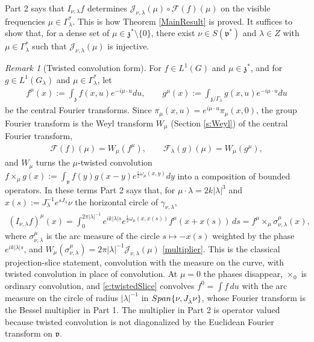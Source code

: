 \documentclass[11pt]{amsart}
\theoremstyle{plain}
\theoremstyle{definition}
\theoremstyle{remark}
\newtheorem{remark}[theorem]{Remark}
\numberwithin{equation}{section}
\def\fz{\mathfrak{z}}
\def\fv{\mathfrak{v}}
\def\cJ{\mathcal{J}}
\def\cF{\mathcal{F}}
\def\mz{\setminus\{0\}}
\numberwithin{equation}{section}
\begin{document}
Part 2 says that $I_{\nu, \lambda}f$ determines $\cJ_{\nu, \lambda}(\mu)\circ\cF(f)(\mu)$ on the visible frequencies $\mu\in \Gamma_\lambda^*$. This is how Theorem \ref{MainResult} is proved. It suffices to show that, for a dense set of $\mu\in \fz^*\mz$, there exist $\nu\in S(\fv^*)$ and $\lambda\in Z$ with $\mu\in \Gamma_\lambda^*$ such that $\cJ_{\nu, \lambda}(\mu)$ is injective. 

\begin{remark}[Twisted convolution form]\label{r:twistedSlice}
	For $f\in L^1(G)$ and $\mu\in \fz^*$, and for $g\in L^1(G_\lambda)$ and $\mu\in \Gamma_\lambda^*$, let
	\begin{align}\label{e:centralFT}
		f^\mu(x):=\int_\fz f(x, u)e^{-i\mu\cdot u}du, \qquad g^\mu(x):=\int_{\fz/\Gamma_\lambda}g(x, u)e^{-i\mu\cdot u}du
	\end{align}
	be the central Fourier transforms. Since $\pi_\mu(x, u)=e^{i\mu\cdot u}\pi_\mu(x, 0)$, the group Fourier transform is the Weyl transform $W_\mu$ (Section \ref{s:Weyl}) of the central Fourier transform,
	\begin{align}\label{e:Weyl}
		\cF(f)(\mu)=W_\mu(f^\mu), \qquad \cF_\lambda(g)(\mu)=W_\mu(g^\mu),
	\end{align}
	and $W_\mu$ turns the $\mu$-twisted convolution $f\times_\mu g(x):=\int_\fv f(y)g(x-y)e^{\frac{i}{2}\omega_\mu(x, y)}dy$ into a composition of bounded operators. In these terms Part 2 says that, for $\mu\cdot\lambda=2k|\lambda|^3$ and $x(s):=J_\lambda^{-1}e^{sJ_\lambda}\nu$ the horizontal circle of $\gamma_{\nu, \lambda}$,
	\begin{align}\label{e:twistedSlice}
		(I_{\nu, \lambda}f)^\mu(x)=\int_0^{2\pi|\lambda|^{-1}}e^{ik|\lambda|s}e^{\frac{i}{2}\omega_\mu(x, x(s))}f^\mu(x+x(s))\, ds=f^\mu\times_\mu\sigma^\mu_{\nu, \lambda}(x),
	\end{align}
	where $\sigma^\mu_{\nu, \lambda}$ is the arc measure of the circle $s\mapsto-x(s)$ weighted by the phase $e^{ik|\lambda|s}$, and $W_\mu(\sigma^\mu_{\nu, \lambda})=2\pi|\lambda|^{-1}\cJ_{\nu, \lambda}(\mu)$ \eqref{multiplier}. This is the classical projection-slice statement, convolution with the measure on the curve, with twisted convolution in place of convolution. At $\mu=0$ the phases disappear, $\times_0$ is ordinary convolution, and \eqref{e:twistedSlice} convolves $f^0=\int f\, du$ with the arc measure on the circle of radius $|\lambda|^{-1}$ in ${\rm Span}\{\nu, J_{\hat\lambda}\nu\}$, whose Fourier transform is the Bessel multiplier in Part 1. The multiplier in Part 2 is operator valued because twisted convolution is not diagonalized by the Euclidean Fourier transform on $\fv$.
\end{remark}
\end{document}
